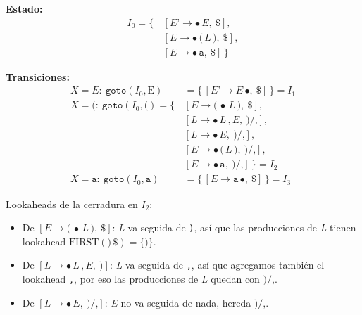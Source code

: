 \documentclass[12pt,letterpaper]{article}
\newcommand{\nt}[1]{\textit{#1}}
\newcommand{\tk}[1]{\texttt{#1}}
\newcommand{\tx}[1]{\text{#1}}
\newcommand{\First}[1]{\mathrm{FIRST}(#1)}
\begin{document}
\begin{enumerate}[label=\arabic*.]
  \textbf{Estado:}
  \[
  \begin{aligned}
    I_0 = \{\, & [\nt{E'}\to\bullet\,\nt{E},\ \tk{\$}],\\
               & [\nt{E}\to\bullet\,\tk{(}\,\nt{L}\,\tk{)},\ \tk{\$}],\\
               & [\nt{E}\to\bullet\,\tk{a},\ \tk{\$}]\,\}
  \end{aligned}
  \]

  \textbf{Transiciones:}
  \[
  \begin{aligned}
    X=\nt{E}:\ \texttt{goto}(I_0,\tx{E}) &= \{\,[\nt{E'}\to\nt{E}\,\bullet,\ \tk{\$}]\,\} = \boxed{I_1}\\[6pt]
    X=\tk{(}:\ \texttt{goto}(I_0,\tk{(}) = \{\, & [\nt{E}\to\tk{(}\,\bullet\,\nt{L}\,\tk{)},\ \tk{\$}],\\
                                                & [\nt{L}\to\bullet\,\nt{L}\,\tk{,}\,\nt{E},\ \tk{)}/\tk{,}],\\
                                                & [\nt{L}\to\bullet\,\nt{E},\ \tk{)}/\tk{,}],\\
                                                & [\nt{E}\to\bullet\,\tk{(}\,\nt{L}\,\tk{)},\ \tk{)}/\tk{,}],\\
                                                & [\nt{E}\to\bullet\,\tk{a},\ \tk{)}/\tk{,}]\,\} = \boxed{I_2}\\[6pt]
    X=\tk{a}:\ \texttt{goto}(I_0,\tk{a}) &= \{\,[\nt{E}\to\tk{a}\,\bullet,\ \tk{\$}]\,\} = \boxed{I_3}
  \end{aligned}
  \]
  
  Lookaheads de la cerradura en $I_2$:
  \begin{itemize}
  \item De $[\nt{E}\to\tk{(}\,\bullet\,\nt{L}\,\tk{)},\ \tk{\$}]$: \nt{L} va seguida de \tk{)}, así que las
    producciones de \nt{L} tienen lookahead $\First{\tk{)}\,\tk{\$}}=\{\tk{)}\}$.
    
  \item De $[\nt{L}\to\bullet\,\nt{L}\,\tk{,}\,\nt{E},\ \tk{)}]$: \nt{L} va seguida de \tk{,}, así que agregamos
    también el lookahead \tk{,}, por eso las producciones de \nt{L} quedan con $\tk{)}/\tk{,}$.
    
  \item De $[\nt{L}\to\bullet\,\nt{E},\ \tk{)}/\tk{,}]$: \nt{E} no va seguida de nada, hereda $\tk{)}/\tk{,}$.
  \end{itemize}

  \medskip


\end{enumerate}
\end{document}
